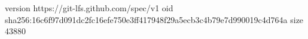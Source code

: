 version https://git-lfs.github.com/spec/v1
oid sha256:16c6f97d091dc2fc16efe750e3ff417948f29a5ecb3c4b79e7d990019c4d764a
size 43880

